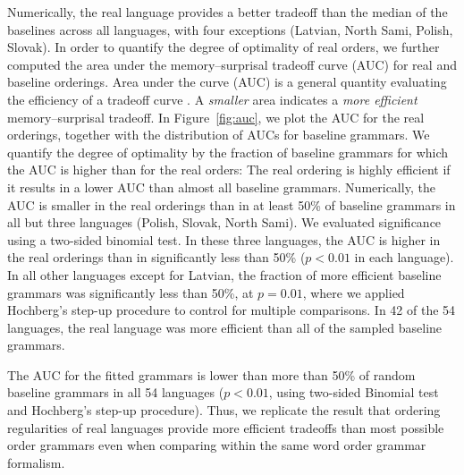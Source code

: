 Numerically, the real language provides a better tradeoff than the median of the baselines across all languages, with four exceptions (Latvian, North Sami, Polish, Slovak). In order to quantify the degree of optimality of real orders, we further computed the area under the memory--surprisal tradeoff curve (AUC) for real and baseline orderings.
Area under the curve (AUC) is a general quantity evaluating the efficiency of a tradeoff curve \citep{bradley1997use}.
A \emph{smaller} area indicates a \emph{more efficient} memory--surprisal tradeoff.
In Figure~\ref{fig:auc}, we plot the AUC for the real orderings, together with the distribution of AUCs for baseline grammars.
We quantify the degree of optimality by the fraction of baseline grammars for which the AUC is higher than for the real orders:
The real ordering is highly efficient if it results in a lower AUC than almost all baseline grammars.
Numerically, the AUC is smaller in the real orderings than in at least 50\% of baseline grammars in all but three languages (Polish, Slovak, North Sami).
We evaluated significance using a two-sided binomial test.
In these three languages, the AUC is higher in the real orderings than in significantly less than 50\% ($p < 0.01$ in each language).
In all other languages except for Latvian, the fraction of more efficient baseline grammars was significantly less than 50\%, at $p=0.01$, where we applied Hochberg's step-up procedure \citep{hochberg1988sharper} to control for multiple comparisons.
In 42 of the 54 languages, the real language was more efficient than all of the sampled baseline grammars. %



The AUC for the fitted grammars is lower than more than 50\% of random baseline grammars in all 54 languages ($p < 0.01$, using two-sided Binomial test and Hochberg's step-up procedure). Thus, we replicate the result that ordering regularities of real languages provide more efficient tradeoffs than most possible order grammars even when comparing within the same word order grammar formalism.




